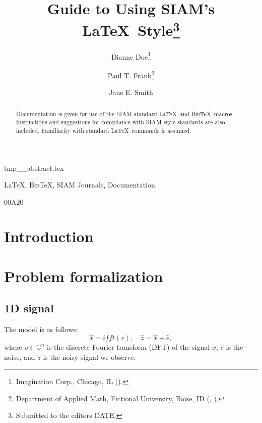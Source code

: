 \documentclass[final,onefignum,onetabnum]{siamart190516}
\title{Guide to Using SIAM's \LaTeX\ Style\thanks{Submitted to the editors DATE.
\funding{Funding information goes here.}}}
\author{Dianne Doe\thanks{Imagination Corp., Chicago, IL (\email{ddoe@imag.com}).}
\and Paul T. Frank\thanks{Department of Applied Math, Fictional University, Boise, ID (\email{ptfrank@fictional.edu}, \email{jesmith@fictional.edu}).}
\and Jane E. Smith\footnotemark[3]}
\newcommand{\BibTeX}{{\scshape Bib}\TeX\xspace}
\begin{document}
\maketitle

\begin{tcbverbatimwrite}{tmp_\jobname_abstract.tex}
\begin{abstract}
  Documentation is given for use of the SIAM standard \LaTeX\ and \BibTeX\
  macros.  Instructions and suggestions for compliance with SIAM style
  standards are also included. Familiarity with standard \LaTeX\ commands is assumed.
\end{abstract}

\begin{keywords}
  \LaTeX, \BibTeX, SIAM Journals, Documentation 
\end{keywords}

\begin{AMS}
  00A20 
\end{AMS}
\end{tcbverbatimwrite}

\section{Introduction}


\section{Problem formalization}
\subsection{1D signal}
The model is as follows:
\begin{equation}
    \widehat{x} = ifft(v), \quad \widehat{z} = \widehat{x} + \widehat{e},
\end{equation}
where $v\in \mathbb{C}^n$ is the discrete Fourier transform (DFT) of the signal $x$, $\widehat{e}$ is the noise, and $\widehat{z}$ is the noisy signal we observe. 
\end{document}
